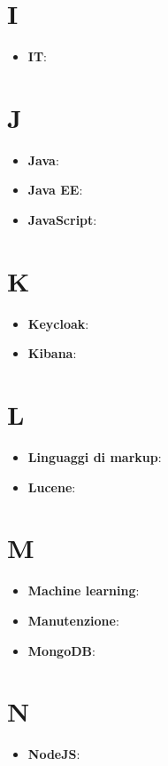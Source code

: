 \documentclass[a4paper, oneside, openany]{article}
\begin{document}
\section{I}
\begin{itemize}
\item \textbf{IT}:
\end{itemize}

\section{J}
\begin{itemize}
\item \textbf{Java}:
\item \textbf{Java EE}:
\item \textbf{JavaScript}:
\end{itemize}

\section{K}
\begin{itemize}
\item \textbf{Keycloak}:
\item \textbf{Kibana}:
\end{itemize}

\section{L}
\begin{itemize}
\item \textbf{Linguaggi di markup}:
\item \textbf{Lucene}:
\end{itemize}

\section{M}
\begin{itemize}
\item \textbf{Machine learning}:
\item \textbf{Manutenzione}:
\item \textbf{MongoDB}:
\end{itemize}

\section{N}
\begin{itemize}
\item \textbf{NodeJS}:
\end{itemize}
\end{document}
